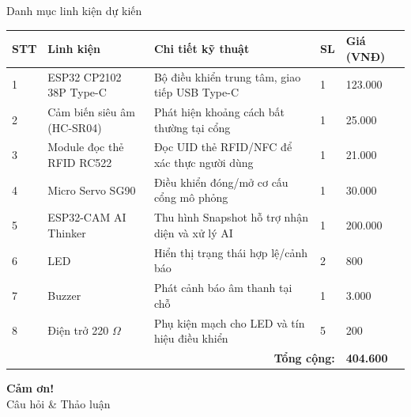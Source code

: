 \documentclass[aspectratio=169]{beamer}
\begin{document}
\begin{frame}{Danh mục linh kiện dự kiến}
  \tiny
  \renewcommand{\arraystretch}{1.2}
  \begin{tabular}{p{0.35cm}p{2.45cm}p{5.9cm}p{0.75cm}p{1.35cm}}
    \toprule
    \textbf{STT} & \textbf{Linh kiện} & \textbf{Chi tiết kỹ thuật} & \textbf{SL} & \textbf{Giá (VNĐ)} \\
    \midrule
    1 & ESP32 CP2102 38P Type-C & Bộ điều khiển trung tâm, giao tiếp USB Type-C & 1 & 123.000 \\
    2 & Cảm biến siêu âm (HC-SR04) & Phát hiện khoảng cách bất thường tại cổng & 1 & 25.000 \\
    3 & Module đọc thẻ RFID RC522 & Đọc UID thẻ RFID/NFC để xác thực người dùng & 1 & 21.000 \\
    4 & Micro Servo SG90 & Điều khiển đóng/mở cơ cấu cổng mô phỏng & 1 & 30.000 \\
    5 & ESP32-CAM AI Thinker & Thu hình Snapshot hỗ trợ nhận diện và xử lý AI & 1 & 200.000 \\
    6 & LED & Hiển thị trạng thái hợp lệ/cảnh báo & 2 & 800 \\
    7 & Buzzer & Phát cảnh báo âm thanh tại chỗ & 1 & 3.000 \\
    8 & Điện trở 220 $\Omega$ & Phụ kiện mạch cho LED và tín hiệu điều khiển & 5 & 200 \\
    \midrule
    \multicolumn{4}{r}{\textbf{Tổng cộng:}} & \textbf{404.600} \\
    \bottomrule
  \end{tabular}
\end{frame}

\begin{frame}[plain]
  \begin{center}
    \vspace{2.5cm}
    {\Huge \textbf{Cảm ơn!}}\\[0.8em]
    {\Large Câu hỏi \& Thảo luận}
  \end{center}
\end{frame}
\end{document}
